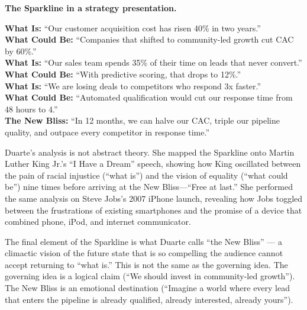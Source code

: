\begin{diagnosisbox}
\textbf{The Sparkline in a strategy presentation.}

\vspace{6pt}
\textbf{What Is:} ``Our customer acquisition cost has risen 40\% in two years.''\\
\textbf{What Could Be:} ``Companies that shifted to community-led growth cut CAC by 60\%.''\\
\textbf{What Is:} ``Our sales team spends 35\% of their time on leads that never convert.''\\
\textbf{What Could Be:} ``With predictive scoring, that drops to 12\%.''\\
\textbf{What Is:} ``We are losing deals to competitors who respond 3x faster.''\\
\textbf{What Could Be:} ``Automated qualification would cut our response time from 48 hours to 4.''\\
\textbf{The New Bliss:} ``In 12 months, we can halve our CAC, triple our pipeline quality, and outpace every competitor in response time.''
\end{diagnosisbox}

Duarte's analysis is not abstract theory. She mapped the Sparkline onto Martin Luther King Jr.'s ``I Have a Dream'' speech, showing how King oscillated between the pain of racial injustice (``what is'') and the vision of equality (``what could be'') nine times before arriving at the New Bliss---``Free at last.'' She performed the same analysis on Steve Jobs's 2007 iPhone launch, revealing how Jobs toggled between the frustrations of existing smartphones and the promise of a device that combined phone, iPod, and internet communicator.

The final element of the Sparkline is what Duarte calls ``the New Bliss'' --- a climactic vision of the future state that is so compelling the audience cannot accept returning to ``what is.'' This is not the same as the governing idea. The governing idea is a logical claim (``We should invest in community-led growth''). The New Bliss is an emotional destination (``Imagine a world where every lead that enters the pipeline is already qualified, already interested, already yours'').

